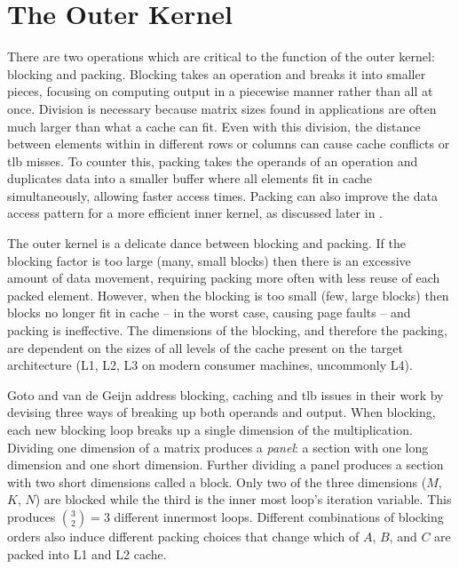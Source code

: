 \documentclass[\main/thesis.tex]{subfiles}
\begin{document}
\section{The Outer Kernel}
\label{sec:outerKernel}
There are two operations which are critical to the function of the outer kernel: blocking and packing.
Blocking takes an operation and breaks it into smaller pieces, focusing on computing output in a piecewise manner rather than all at once.
Division is necessary because matrix sizes found in applications are often much larger than what a cache can fit.
Even with this division, the distance between elements within in different rows or columns can cause cache conflicts or \gls{tlb} misses.
To counter this, packing takes the operands of an operation and duplicates data into a smaller buffer where all elements fit in cache simultaneously, allowing faster access times.
Packing can also improve the data access pattern for a more efficient inner kernel, as discussed later in .

The outer kernel is a delicate dance between blocking and packing.
If the blocking factor is too large (\ie many, small blocks) then there is an excessive amount of data movement, requiring packing more often with less reuse of each packed element.
However, when the blocking is too small (\ie few, large blocks) then blocks no longer fit in cache -- in the worst case, causing page faults -- and packing is ineffective.
The dimensions of the blocking, and therefore the packing, are dependent on the sizes of all levels of the cache present on the target architecture (L1, L2, L3 on modern consumer machines, uncommonly L4).

Goto and van de Geijn address blocking, caching and \gls{tlb} issues in their work by devising three ways of breaking up both operands and output.
When blocking, each new blocking loop breaks up a single dimension of the multiplication.
Dividing one dimension of a matrix produces a \emph{panel}: a section with one long dimension and one short dimension.
Further dividing a panel produces a section with two short dimensions called a block.
Only two of the three dimensions ($M$, $K$, $N$) are blocked while the third is the inner most loop's iteration variable.
This produces $\binom{3}{2}=3$ different innermost loops\footnotemark.
Different combinations of blocking orders also induce different packing choices that change which of $A$, $B$, and $C$ are packed into L1 and L2 cache.
\end{document}
